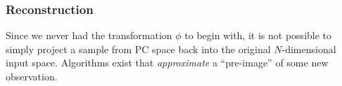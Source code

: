 \subsubsection{Reconstruction}

\begin{frame}{\subsubsecname}


Since we never had the transformation $\phi$ to begin with, it is not possible to simply project a sample from PC space back into the original $N$-dimensional input space. 
Algorithms exist that \emph{approximate} a ``pre-image'' of some new observation.

\end{frame}
